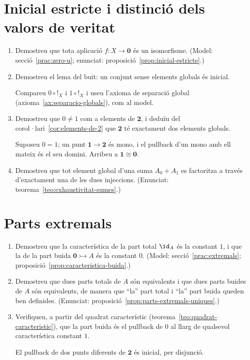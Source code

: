 \section{Inicial estricte i distinció dels valors de veritat}

\begin{enumerate}[resume]
  \item Demostreu que tota aplicació \(f:X\to\mathbf0\) és un isomorfisme. (Model: secció~\ref{prac:zero-u}; enunciat: proposició~\ref{prop:inicial-estricte}.)

  \item Demostreu el lema del buit: un conjunt sense elements globals és inicial. \begin{indicacio}Compareu \(0\circ{!}_X\) i \(1\circ{!}_X\) i useu l'axioma de separació global (axioma~\ref{ax:separacio-globals}), com al model.\end{indicacio}

  \item Demostreu que \(0\neq1\) com a elements de \(\mathbf2\), i deduïu del corol·lari~\ref{cor:elements-de-2} que \(\mathbf2\) té exactament dos elements globals. \begin{indicacio}Suposeu \(0=1\); un punt \(\mathbf1\to\mathbf2\) és mono, i el pullback d'un mono amb ell mateix és el seu domini. Arribeu a \(\mathbf1\cong\mathbf0\).\end{indicacio}

  \item Demostreu que tot element global d'una suma \(A_0+A_1\) es factoritza a través d'exactament una de les dues injeccions. (Enunciat: teorema~\ref{teo:exhaustivitat-sumes}.)
\end{enumerate}

\section{Parts extremals}

\begin{enumerate}[resume]
  \item Demostreu que la característica de la part total \(\id_A\) és la constant \(1\), i que la de la part buida \(\mathbf0\rightarrowtail A\) és la constant \(0\). (Model: secció~\ref{prac:extremals}; proposició~\ref{prop:caracteristica-buida}.)

  \item Demostreu que dues parts totals de \(A\) són equivalents i que dues parts buides de \(A\) són equivalents, de manera que \enquote{la} part total i \enquote{la} part buida queden ben definides. (Enunciat: proposició~\ref{prop:parts-extremals-uniques}.)

  \item Verifiqueu, a partir del quadrat característic (teorema~\ref{teo:quadrat-caracteristic}), que la part buida és el pullback de \(0\) al llarg de qualsevol característica constant \(1\). \begin{indicacio}El pullback de dos punts diferents de \(\mathbf2\) és inicial, per disjunció.\end{indicacio}
\end{enumerate}

